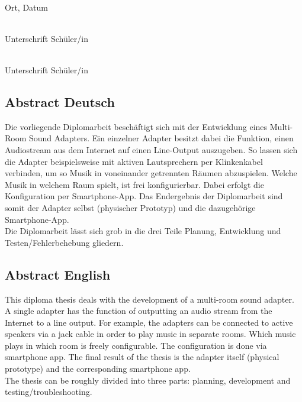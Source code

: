 \documentclass[]{article}
\begin{document}
\vspace{30mm}

\noindent
\begin{minipage}[c]{5cm}
	\centering \dotfill \\
	Ort, Datum
\end{minipage}
\hfill
    \begin{minipage}[c]{5cm}
        \centering \dotfill \\
        Unterschrift Schüler/in
    \end{minipage}
    
\vspace{10mm}

\noindent
\begin{flushright}
    \begin{minipage}[c]{5cm}
        \centering \dotfill \\
        Unterschrift Schüler/in
    \end{minipage}
\end{flushright}

\pagebreak
\subsection{Abstract Deutsch}
Die vorliegende Diplomarbeit beschäftigt sich mit der Entwicklung eines Multi-Room Sound Adapters. Ein einzelner Adapter besitzt dabei die Funktion, einen Audiostream aus dem Internet auf einen Line-Output auszugeben. So lassen sich die Adapter beispielsweise mit aktiven Lautsprechern per Klinkenkabel verbinden, um so Musik in voneinander getrennten Räumen abzuspielen. Welche Musik in welchem Raum spielt, ist frei konfigurierbar. Dabei erfolgt die Konfiguration per Smartphone-App. Das Endergebnis der Diplomarbeit sind somit der Adapter selbst (physischer Prototyp) und die dazugehörige Smartphone-App. \newline \\
Die Diplomarbeit lässt sich grob in die drei Teile Planung, Entwicklung und Testen/Fehlerbehebung gliedern.
\subsection{Abstract English}
This diploma thesis deals with the development of a multi-room sound adapter. A single adapter has the function of outputting an audio stream from the Internet to a line output. For example, the adapters can be connected to active speakers via a jack cable in order to play music in separate rooms. Which music plays in which room is freely configurable. The configuration is done via smartphone app. The final result of the thesis is the adapter itself (physical prototype) and the corresponding smartphone app. \newline \\
The thesis can be roughly divided into three parts: planning, development and testing/troubleshooting.
\end{document}
